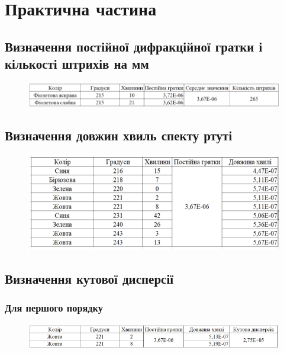 \section{Практична частина}
\setlength{\parindent}{4em}
\subsection{Визначення постійної дифракційної гратки і кількості штрихів на мм}

\begin{figure}[ht]

\centering

\includegraphics[width=1\linewidth]{Pics/tabl1.png}

\label{table1}

\end{figure}

\subsection{Визначення довжин хвиль спекту ртуті}

\begin{figure}[ht]

\centering

\includegraphics[width=1\linewidth]{Pics/tabl2.png}

\label{table1}

\end{figure}
\newpage

\subsection{Визначення кутової дисперсії}
\subsubsection{Для першого порядку}
\begin{figure}[ht]

\centering

\includegraphics[width=1\linewidth]{Pics/tabl3.png}

\label{table1}

\end{figure}
